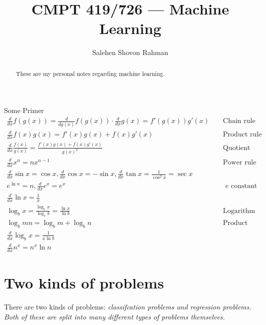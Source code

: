 \documentclass{tufte-handout}
\title{CMPT 419/726 --- Machine Learning}
\author[Salehen Shovon Rahman]{Salehen Shovon Rahman}
\begin{document}
\maketitle%

\begin{abstract}
\noindent
These are my personal notes regarding machine learning.
\end{abstract}


\begin{fullwidth}
  \begin{tcolorbox}
    Some Primer
    \begin{align}
      \frac{d}{dx}f(g(x)) = \frac{d}{d{g(x)}}f(g(x))\cdot\frac{d}{dx}g(x) = f'(g(x))g'(x) &  & \text{ Chain rule} \\
      \frac{d}{dx}f(x)g(x) = f'(x)g(x) + f(x)g'(x) & & \text{ Product rule} \\
      \frac{d}{dx}\frac{f(x)}{g(x)} = \frac{f'(x)g(x) + f(x)g'(x)}{g(x)^2} & & \text{ Quotient rule} \\
      \frac{d}{dx}x^n = nx^{n - 1} & & \text{ Power rule} \\
      \frac{d}{dx}\sin x = \cos x, \frac{d}{dx}\cos x = -\sin x, \frac{d}{dx}\tan x = \frac{1}{\cos^2x} = \sec x & & \\
      e^{\ln n} = n, \frac{d}{dx}e^x = e^x & & \text{ $e$ constant properties} \\
      \frac{d}{dx}\ln x = \frac{1}{x} & & \\
      \log_bx = \frac{\log_ex}{\log_eb} = \frac{\ln x}{\ln b} & & \text{ Logarithm identity} \\
      \log_bmn = \log_bm + \log_bn & & \text{ Product inside logarithms} \\
      \frac{d}{dx}\log_bx = \frac{1}{x\ln b} & & \\
      \frac{d}{dx}n^x = n^x\ln n & &
    \end{align}
  \end{tcolorbox}
\end{fullwidth}

\section{Two kinds of problems}

There are two kinds of problems: \em{classifcation} problems and \em{regression} problems. Both of these are split into many different types of problems themselves. 
\end{document}
